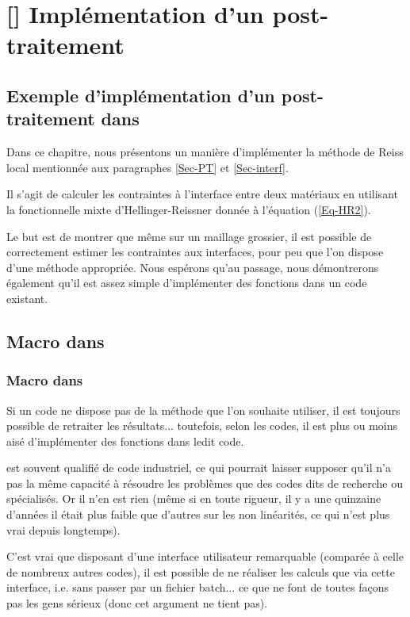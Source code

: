\ifVersionAvecExemplesSepares
   \chapter{[\ansys] Implémentation d'un post-traitement}
\else
   \section{Exemple d'implémentation d'un post-traitement dans \ansys}
\fi

Dans ce chapitre, nous présentons un manière d'implémenter la méthode de Reiss local mentionnée aux
paragraphes \ref{Sec-PT} et \ref{Sec-interf}.

Il s'agit de calculer les contraintes à l'interface entre deux matériaux en utilisant la fonctionnelle mixte d'Hellinger-Reissner
donnée à l'équation (\ref{Eq-HR2}).

\medskip
Le but est de montrer que même sur un maillage grossier, il est possible de correctement estimer les contraintes 
aux interfaces, pour peu que l'on dispose d'une méthode appropriée. Nous espérons qu'au passage, nous
démontrerons également qu'il est assez simple d'implémenter des fonctions dans un code existant.





\medskip
\ifVersionAvecExemplesSepares
   \section{Macro dans \ansys}
\else
   \subsection{Macro dans \ansys}
\fi

Si un code ne dispose pas de la méthode que l'on souhaite utiliser, il est toujours possible de retraiter les
résultats... toutefois, selon les codes, il est plus ou moins aisé d'implémenter des fonctions dans ledit code.

\medskip
\ansys est souvent qualifié de \og code industriel\fg{}, ce qui pourrait laisser supposer qu'il n'a pas la même capacité
à résoudre les problèmes que des codes dits \og de recherche\fg{} ou \og spécialisés\fg{}.
Or il n'en est rien (même si en toute rigueur, il y a une quinzaine d'années il était plus faible que d'autres sur
les non linéarités, ce qui n'est plus vrai depuis longtemps).

C'est vrai que disposant d'une interface utilisateur remarquable (comparée à celle de nombreux autres codes),
il est possible de ne réaliser les calculs que via cette interface, i.e. sans passer par un fichier batch... ce que ne
font de toutes façons pas les gens sérieux (donc cet argument ne tient pas).

